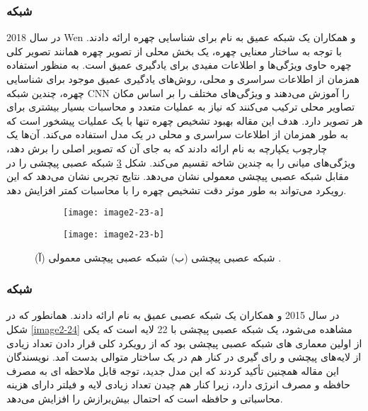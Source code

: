 \subsubsection{	شبکه }
در سال 2018 Wen و همکاران \cite{WEN201894} یک شبکه عمیق به نام  برای شناسایی چهره ارائه دادند. با توجه به ساختار معنایی چهره، یک بخش محلی از تصویر چهره همانند تصویر کلی چهره حاوی ویژگی‌ها و اطلاعات مفیدی برای یادگیری عمیق است. به منظور استفاده همزمان از اطلاعات سراسری و محلی، روش‌های یادگیری عمیق موجود برای شناسایی چهره، چندین شبکه CNN را آموزش می‌دهند و ویژگی‌های مختلف را بر اساس مکان تصاویر محلی ترکیب می‌کنند که نیاز به عملیات متعدد و محاسبات بسیار بیشتری برای هر تصویر دارد. هدف این مقاله بهبود تشخیص چهره تنها با یک عملیات پیشخور  است که به طور همزمان از اطلاعات سراسری و محلی در یک مدل استفاده می‌کند. آن‌ها یک چارچوب یکپارچه به نام  ارائه دادند که به جای آن که تصویر اصلی را برش دهد، ویژگی‌های میانی را به چندین شاخه تقسیم می‌کند. شکل ‏\ref{image2-23} شبکه عصبی پیچشی  را در مقابل شبکه عصبی پیچشی معمولی نشان می‌دهد. نتایج تجربی نشان می‌دهد که این رویکرد می‌تواند به طور موثر دقت تشخیص چهره را با محاسبات کمتر افزایش دهد. 

\begin{figure}
\begin{subfigure}{.5\textwidth}
  \centering
  \texttt{[image: image2-23-a]}
  \caption{ }
  \label{image2-23-a}
\end{subfigure}
\begin{subfigure}{.5\textwidth}
  \centering
  \texttt{[image: image2-23-b]}
  \caption{ }
  \label{image2-23-b}
\end{subfigure}
  \caption{ (آ) شبکه عصبی پیچشی   (ب) شبکه عصبی پیچشی معمولی \cite{WEN201894}.}
\label{image2-23}
\end{figure}

\subsubsection{	شبکه }
در سال 2015  و همکاران \cite{7298594} یک شبکه عصبی عمیق به نام  ارائه دادند. همانطور که در شکل \ref{image2-24} مشاهده می‌شود،  یک شبکه عصبی پیچشی با 22 لایه است که یکی از اولین معماری های شبکه عصبی پیچشی بود که از رویکرد کلی قرار دادن تعداد زیادی از لایه‌های پیچشی و رای گیری  در کنار هم در یک ساختار متوالی بدست آمد. نویسندگان این مقاله همچنین تأکید کردند که این مدل جدید، توجه قابل ملاحظه ای به مصرف حافظه و مصرف انرژی دارد، زیرا کنار هم چیدن تعداد زیادی لایه و فیلتر دارای هزینه محاسباتی و حافظه است که احتمال بيش‌برازش  را افزایش می‌دهد.
 
